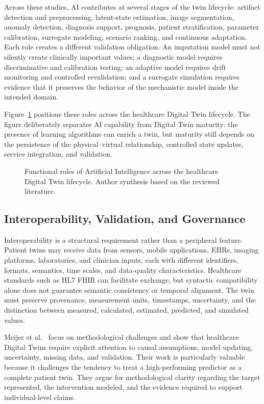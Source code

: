 Across these studies, AI contributes at several stages of the twin lifecycle: artifact detection and preprocessing, latent-state estimation, image segmentation, anomaly detection, diagnosis support, prognosis, patient stratification, parameter calibration, surrogate modeling, scenario ranking, and continuous adaptation. Each role creates a different validation obligation. An imputation model must not silently create clinically important values; a diagnostic model requires discriminative and calibration testing; an adaptive model requires drift monitoring and controlled revalidation; and a surrogate simulation requires evidence that it preserves the behavior of the mechanistic model inside the intended domain.

Figure~\ref{fig:ai_lifecycle_dt} positions these roles across the healthcare Digital Twin lifecycle. The figure deliberately separates AI capability from Digital Twin maturity: the presence of learning algorithms can enrich a twin, but maturity still depends on the persistence of the physical--virtual relationship, controlled state updates, service integration, and validation.

\begin{figure}[H]
    \centering
    \resizebox{0.98\textwidth}{!}{}
    \caption{Functional roles of Artificial Intelligence across the healthcare Digital Twin lifecycle. Author synthesis based on the reviewed literature.}
    \label{fig:ai_lifecycle_dt}
\end{figure}

\subsection{Interoperability, Validation, and Governance}
Interoperability is a structural requirement rather than a peripheral feature. Patient twins may receive data from sensors, mobile applications, EHRs, imaging platforms, laboratories, and clinician inputs, each with different identifiers, formats, semantics, time scales, and data-quality characteristics. Healthcare standards such as HL7 FHIR can facilitate exchange, but syntactic compatibility alone does not guarantee semantic consistency or temporal alignment. The twin must preserve provenance, measurement units, timestamps, uncertainty, and the distinction between measured, calculated, estimated, predicted, and simulated values.

Meijer et al.~\cite{meijer2023methodological} focus on methodological challenges and show that healthcare Digital Twins require explicit attention to causal assumptions, model updating, uncertainty, missing data, and validation. Their work is particularly valuable because it challenges the tendency to treat a high-performing predictor as a complete patient twin. They argue for methodological clarity regarding the target represented, the intervention modeled, and the evidence required to support individual-level claims.

